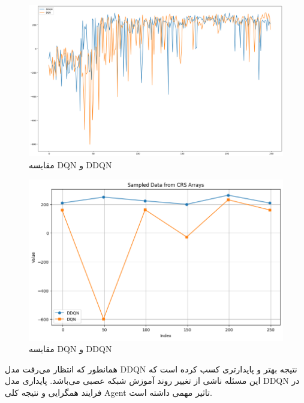 \documentclass{article}
\begin{document}
\begin{figure}[H]
\centering
\includegraphics[width=1.0\linewidth]{img/result3}
\caption{مقایسه DQN و DDQN}
\label{fig:result3}
\end{figure}

\begin{figure}[H]
\centering
\includegraphics[width=1.0\linewidth]{img/result4}
\caption{مقایسه DQN و DDQN}
\label{fig:result4}
\end{figure}

همانطور که انتظار می‌رفت مدل DDQN نتیجه بهتر و پایدارتری کسب کرده است که این مسئله ناشی از تغییر روند آموزش شبکه عصبی می‌باشد. پایداری مدل DDQN در فرایند همگرایی و نتیجه کلی Agent تاثیر مهمی داشته است.


\end{document}
